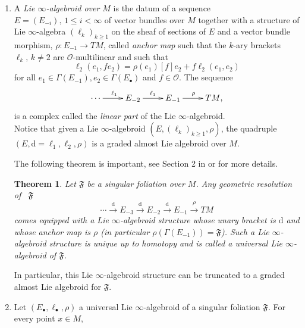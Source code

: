 \documentclass[10pt]{article}
\theoremstyle{plain}
\newtheorem{theorem}[lemma]{Theorem}
\theoremstyle{definition}
\theoremstyle{remark}
\newcommand{\dd}{\mathrm{d}}
\begin{document}
\begin{enumerate}
\begin{enumerate}
\item $\rho$ is a morphism, i.e., for all  $x,y \in \Gamma(E_{-1})$
$$ \rho (\ell_2 (x,y)) = [\rho (x), \rho (y)].$$
 \end{enumerate}
The $\mathcal{O}$-linear map $\rho$ is called the \emph{anchor map}, and $\ell_1$ the \emph{differential}.
\item  A \emph{Lie $\infty$-algebroid over $M$} is the datum of a sequence $E = (E_{-i} ),\,1\leq i<\infty$ of vector bundles over $M$ together with a structure of Lie $\infty$-algebra $(\ell_k)_{k\geq 1}$ on the sheaf of sections of $E$ and a vector bundle morphism, $\rho\colon E_{-1}\rightarrow TM$, called \emph{anchor map} such that the $k$-ary brackets $\ell_k,\,k\neq 2$ are $\mathcal O$-multilinear and such that
\begin{equation}
  \ell_2(e_1, f e_2) =\rho(e_1)[f]e_2 + f\ell_2(e_1, e_2) 
\end{equation}
for all $e_1\in \Gamma(E_{-1} ), e_2\in\Gamma(E_\bullet)$ and $f\in\mathcal O$. The sequence
\begin{equation}\label{linpart}
        \xymatrix{\cdots\ar[r]^{\ell_1}&E_{-2}\ar[r]^{\ell_1}&E_{-1}\ar[r]^{{\rho}}&{TM},}
    \end{equation}
is a complex called the \emph{linear part} of the Lie $\infty$-algebroid. \\



Notice that given a Lie $\infty$-algebroid $(E, (\ell_k)_{k\geq 1},\rho)$, the quadruple $(E,\dd=\ell_1,\ell_2, \rho)$  is a graded almost  Lie algebroid over $M$.

The following theorem is important, see Section 2 in \cite{LLS} or \cite{CLRL} for more details. \begin{theorem}
Let $\mathfrak{F}$ be a singular foliation over $M$.
Any geometric resolution  of ~$\mathfrak F$ 
\begin{equation}
    \label{eq:resolutions}
\cdots \stackrel{\dd} \longrightarrow E_{-3} \stackrel{\dd}{\longrightarrow} E_{-2} \stackrel{\dd}{\longrightarrow} E_{-1} \stackrel{\rho}{\longrightarrow} TM \end{equation}
  comes equipped with a Lie $\infty $-algebroid structure whose unary bracket is $\dd $ and whose anchor map is $\rho$ (in particular $\rho(\Gamma(E_{-1}))=\mathfrak{F}$). Such a Lie $\infty $-algebroid structure is unique up to homotopy and is called a \emph{universal Lie $\infty $-algebroid of} $\mathfrak F$.
  \end{theorem}
  In particular, this Lie $\infty$-algebroid structure can be truncated to a graded almost  Lie algebroid for $\mathfrak{F}$.
  \item \label{item:infty-isotropy}  Let $\left(E_\bullet,\ell_\bullet, \rho\right)$  a universal Lie $\infty$-algebroid of a singular foliation $\mathfrak{F}$. For every point $x\in M$, 
  

\end{enumerate}
\end{document}
